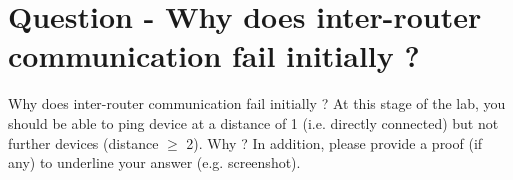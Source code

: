 \section{Question - Why does inter-router communication fail initially ?}

\begin{questionBox}{Why does inter-router communication fail initially ?}
    At this stage of the lab, you should be able to ping device at a distance of 1 (i.e. directly connected) but not further devices (distance $\geq$ 2). Why ?
    In addition, please provide a proof (if any) to underline your answer (e.g. screenshot).
\end{questionBox}
